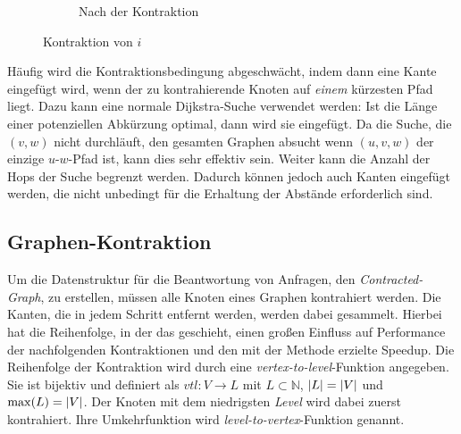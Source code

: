 \begin{figure}[h!]
\begin{subfigure}[b]{0.49\textwidth}
{
    }
    \caption{Nach der Kontraktion}
  \end{subfigure}
  \caption{Kontraktion von $i$}
  \label{graphs:fig:example_contraction}
\end{figure}

Häufig wird die Kontraktionsbedingung abgeschwächt, indem dann eine Kante eingefügt wird, wenn der zu kontrahierende Knoten auf \emph{einem} kürzesten Pfad liegt.
Dazu kann eine normale Dijkstra-Suche verwendet werden: Ist die Länge einer potenziellen Abkürzung optimal, dann wird sie eingefügt.
Da die Suche, die $(v, w)$ nicht durchläuft, den gesamten Graphen absucht wenn $(u, v, w)$ der einzige $u$-$w$-Pfad ist, kann dies sehr effektiv sein.
Weiter kann die Anzahl der Hops der Suche begrenzt werden.
Dadurch können jedoch auch Kanten eingefügt werden, die nicht unbedingt für die Erhaltung der Abstände erforderlich sind.

\subsection{Graphen-Kontraktion}

Um die Datenstruktur für die Beantwortung von Anfragen, den \emph{Contracted-Graph}, zu erstellen, müssen alle Knoten eines Graphen kontrahiert werden. Die Kanten, die in jedem Schritt entfernt werden, werden dabei gesammelt.
Hierbei hat die Reihenfolge, in der das geschieht, einen großen Einfluss auf Performance der nachfolgenden Kontraktionen und den mit der Methode erzielte Speedup.
Die Reihenfolge der Kontraktion wird durch eine \emph{vertex-to-level}-Funktion angegeben.
Sie ist bijektiv und definiert als ${vtl} \colon V \to L$ mit $L \subset \mathbb{N}$, $\abs{L} = \abs{V}$ und $\max(L) = \abs{V}$.
Der Knoten mit dem niedrigsten \emph{Level} wird dabei zuerst kontrahiert.
Ihre Umkehrfunktion wird \emph{level-to-vertex}-Funktion genannt.

